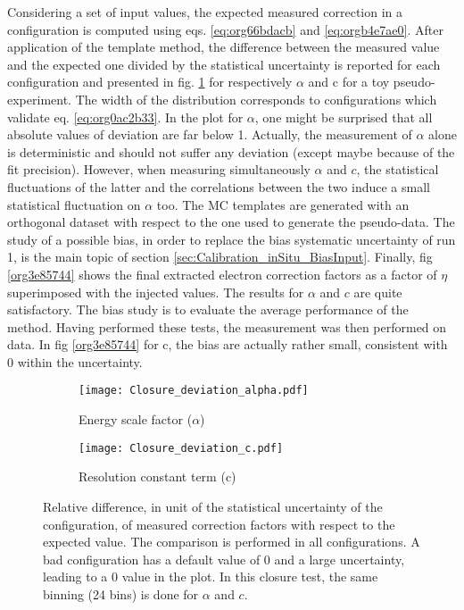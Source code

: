 Considering a set of input values, the expected measured correction in a configuration is computed using eqs. \ref{eq:org66bdacb} and \ref{eq:orgb4e7ae0}.
After application of the template method, the difference between the measured value and the expected one divided by the statistical uncertainty is reported for each configuration and presented in fig. \ref{orge48e2b5} for respectively $\alpha$ and c for a toy pseudo-experiment.
The width of the distribution corresponds to configurations which validate eq. \ref{eq:org0ac2b33}.
In the plot for $\alpha$, one might be surprised that all absolute values of deviation are far below 1.
Actually, the measurement of $\alpha$ alone is deterministic and should not suffer any deviation (except maybe because of the fit precision).
However, when measuring simultaneously $\alpha$ and $c$, the statistical fluctuations of the latter and the correlations between the two induce a small statistical fluctuation on $\alpha$ too.
The MC templates are generated with an orthogonal dataset with respect to the one used to generate the pseudo-data.
The study of a possible bias, in order to replace the bias systematic uncertainty of run 1, is the main topic of section \ref{sec:Calibration_inSitu_BiasInput}.
Finally, fig \ref{org3e85744} shows the final extracted electron correction factors as a factor of $\eta$ superimposed with the injected values.
The results for $\alpha$ and $c$ are quite satisfactory.
The bias study is to evaluate the average performance of the method.
Having performed these tests, the measurement was then performed on data.
In fig \ref{org3e85744} for c, the bias are actually rather small, consistent with 0 within the uncertainty.

\begin{figure}
\begin{subfigure}[t]{0.49\linewidth}
\begin{center}
\texttt{[image: Closure\_deviation\_alpha.pdf]}
\end{center}
\caption{Energy scale factor ($\alpha$)}
\end{subfigure}
\begin{subfigure}[t]{0.49\linewidth}
\begin{center}
\texttt{[image: Closure\_deviation\_c.pdf]}
\end{center}
\caption{Resolution constant term (c)}
\end{subfigure}
\caption{\label{orge48e2b5}
  Relative difference, in unit of the statistical uncertainty of the configuration, of measured correction factors with respect to the expected value.
  The comparison is performed in all configurations. A bad configuration has a default value of 0 and a large uncertainty, leading to a 0 value in the plot.
  In this closure test, the same binning (24 bins) is done for $\alpha$ and $c$.
}
\end{figure}


